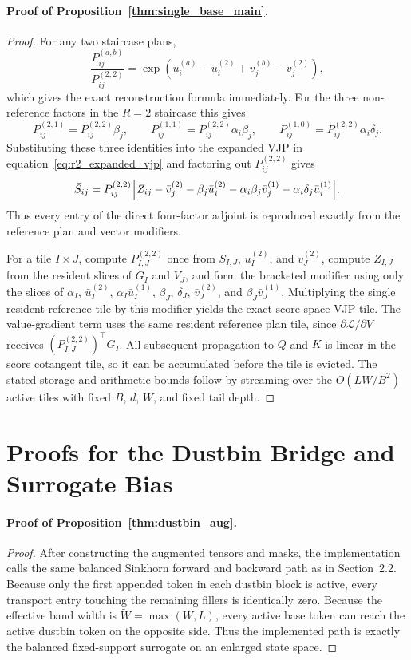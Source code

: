 \documentclass{article}
\begin{document}
\paragraph{Proof of Proposition~\ref{thm:single_base_main}.}
\begin{proof}
For any two staircase plans,
\[
\frac{P_{ij}^{(a,b)}}{P_{ij}^{(2,2)}}
=
\exp(u_i^{(a)}-u_i^{(2)}+v_j^{(b)}-v_j^{(2)}),
\]
which gives the exact reconstruction formula immediately. For the three non-reference factors in the $R=2$ staircase this gives
\[
P^{(2,1)}_{ij}=P^{(2,2)}_{ij}\beta_j,
\qquad
P^{(1,1)}_{ij}=P^{(2,2)}_{ij}\alpha_i\beta_j,
\qquad
P^{(1,0)}_{ij}=P^{(2,2)}_{ij}\alpha_i\delta_j.
\]
Substituting these three identities into the expanded VJP in equation~\eqref{eq:r2_expanded_vjp} and factoring out $P^{(2,2)}_{ij}$ gives
\[
\bar S_{ij}
=
P^{(2,2)}_{ij}
\Bigl[
Z_{ij}
-\bar v^{(2)}_j
-\beta_j\bar u^{(2)}_i
-\alpha_i\beta_j\bar v^{(1)}_j
-\alpha_i\delta_j\bar u^{(1)}_i
\Bigr].
\]
Thus every entry of the direct four-factor adjoint is reproduced exactly from the reference plan and vector modifiers.

For a tile $I\times J$, compute $P^{(2,2)}_{I,J}$ once from $S_{I,J}$, $u_I^{(2)}$, and $v_J^{(2)}$, compute $Z_{I,J}$ from the resident slices of $G_I$ and $V_J$, and form the bracketed modifier using only the slices of $\alpha_I$, $\bar u_I^{(2)}$, $\alpha_I\bar u_I^{(1)}$, $\beta_J$, $\delta_J$, $\bar v_J^{(2)}$, and $\beta_J\bar v_J^{(1)}$. Multiplying the single resident reference tile by this modifier yields the exact score-space VJP tile. The value-gradient term uses the same resident reference plan tile, since $\partial\mathcal L/\partial V$ receives $(P^{(2,2)}_{I,J})^\top G_I$. All subsequent propagation to $Q$ and $K$ is linear in the score cotangent tile, so it can be accumulated before the tile is evicted. The stated storage and arithmetic bounds follow by streaming over the $O(LW/B^2)$ active tiles with fixed $B$, $d$, $W$, and fixed tail depth.
\end{proof}

\section{Proofs for the Dustbin Bridge and Surrogate Bias}
\label{app:bias}

\paragraph{Proof of Proposition~\ref{thm:dustbin_aug}.}
\begin{proof}
After constructing the augmented tensors and masks, the implementation calls the same balanced Sinkhorn forward and backward path as in Section~2.2. Because only the first appended token in each dustbin block is active, every transport entry touching the remaining fillers is identically zero. Because the effective band width is $\widetilde W=\max(W,L)$, every active base token can reach the active dustbin token on the opposite side. Thus the implemented path is exactly the balanced fixed-support surrogate on an enlarged state space.
\end{proof}
\end{document}
